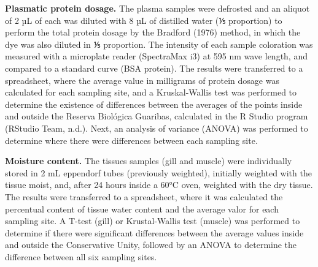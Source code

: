 \documentclass[
  american,
  letterpaper,
  DIV=11,
  numbers=noendperiod]{scrartcl}
\begin{document}
\textbf{Plasmatic protein dosage.} The plasma samples were defrosted and
an aliquot of 2 µL of each was diluted with 8 µL of distilled water (⅕
proportion) to perform the total protein dosage by the Bradford (1976)
method, in which the dye was also diluted in ⅕ proportion. The intensity
of each sample coloration was measured with a microplate reader
(SpectraMax i3) at 595 nm wave length, and compared to a standard curve
(BSA protein). The results were transferred to a spreadsheet, where the
average value in milligrams of protein dosage was calculated for each
sampling site, and a Kruskal-Wallis test was performed to determine the
existence of differences between the averages of the points inside and
outside the Reserva Biológica Guaribas, calculated in the R Studio
program (RStudio Team, n.d.). Next, an analysis of variance (ANOVA) was
performed to determine where there were differences between each
sampling site.

\textbf{Moisture content.} The tissues samples (gill and muscle) were
individually stored in 2 mL eppendorf tubes (previously weighted),
initially weighted with the tissue moist, and, after 24 hours inside a
60°C oven, weighted with the dry tissue. The results were transferred to
a spreadsheet, where it was calculated the percentual content of tissue
water content and the average valor for each sampling site. A T-test
(gill) or Krustal-Wallis test (muscle) was performed to determine if
there were significant differences between the average values inside and
outside the Conservative Unity, followed by an ANOVA to determine the
difference between all six sampling sites.
\end{document}
